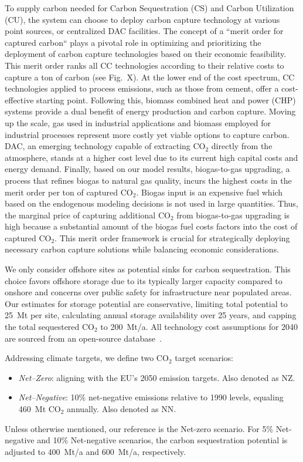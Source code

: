 \documentclass[twocolumn]{article}
\newcommand{\carbon}{CO$_2$}
\begin{document}
To supply carbon needed for Carbon Sequestration (CS) and Carbon Utilization (CU), the system can choose to deploy carbon capture technology at various point sources, or centralized DAC facilities. The concept of a ``merit order for captured carbon`` plays a pivotal role in optimizing and prioritizing the deployment of carbon capture technologies based on their economic feasibility. This merit order ranks all CC technologies according to their relative costs to capture a ton of carbon (see Fig.~X). At the lower end of the cost spectrum, CC technologies applied to process emissions, such as those from cement, offer a cost-effective starting point. Following this, biomass combined heat and power (CHP) systems provide a dual benefit of energy production and carbon capture. Moving up the scale, gas used in industrial applications and biomass employed for industrial processes represent more costly yet viable options to capture carbon. DAC, an emerging technology capable of extracting \carbon{} directly from the atmosphere, stands at a higher cost level due to its current high capital costs and energy demand. Finally, based on our model results, biogas-to-gas upgrading, a process that refines biogas to natural gas quality, incurs the highest costs in the merit order per ton of captured \carbon{}. Biogas input is an expensive fuel which based on the endogenous modeling decisions is not used in large quantities. Thus, the marginal price of capturing additional \carbon{} from biogas-to-gas upgrading is high because a substantial amount of the biogas fuel costs factors into the cost of captured \carbon{}. This merit order framework is crucial for strategically deploying necessary carbon capture solutions while balancing economic considerations.

We only consider offshore sites as potential sinks for carbon sequestration. This choice favors offshore storage due to its typically larger capacity compared to onshore and concerns over public safety for infrastructure near populated areas. Our estimates for storage potential are conservative, limiting total potential to 25~Mt per site, calculating annual storage availability over 25 years, and capping the total sequestered \carbon{} to 200~Mt/a. All technology cost assumptions for 2040 are sourced from an open-source database~\cite{lisazeyenPyPSATechnologydataTechnology2023}.


Addressing climate targets, we define two \carbon{} target scenarios:
\begin{itemize}
    \item[] \textit{Net--Zero}: aligning with the EU's 2050 emission targets. Also denoted as NZ.
    \item[] \textit{Net--Negative}: 10\% net-negative emissions relative to 1990 levels, equaling 460~Mt \carbon{} annually. Also denoted as NN.
\end{itemize}
Unless otherwise mentioned, our reference is the Net-zero scenario. For 5\% Net-negative and 10\% Net-negative scenarios, the carbon sequestration potential is adjusted to 400~Mt/a and 600~Mt/a, respectively.
\end{document}
